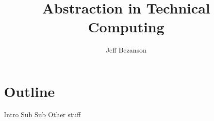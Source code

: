 \documentclass[12pt]{article}
\title{Abstraction in Technical Computing}
\author{Jeff Bezanson}
\begin{document}
\maketitle

\section{Outline}

\begin{outline}[enumerate]
  \1 Intro
  \2 Sub
  \2 Sub
  \1 Other stuff
\end{outline}
\end{document}
